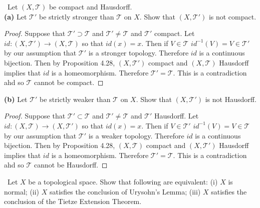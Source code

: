 \documentclass[11pt]{amsart}
\theoremstyle{definition}
\numberwithin{theorem}{section}
\numberwithin{definition}{section}
\numberwithin{equation}{section}
\def\scriptt{{\mathcal T}}
\begin{document}
\medskip {}\ Let $(X, \scriptt)$ be compact and Hausdorff. \\ 
\noindent \textbf{(a)} Let $\scriptt'$ be strictly stronger than $\scriptt$ on $X$. Show that $(X, \scriptt')$ is not compact.
\begin{proof}
	Suppose that $\scriptt' \supset \scriptt$ and $\scriptt' \neq \scriptt$ and $\scriptt'$ compact. Let $
	id: (X, \scriptt') \to (X, \scriptt)$ so that $id(x) = x$. Then if $V \in \scriptt$ $id^{-1}(V) = V \in \scriptt'$
	by our assumption that $\scriptt'$ is a stronger topology. Therefore $id$ is a continuous bijection. Then by Proposition
	4.28, $(X, \scriptt')$ compact and $(X, \scriptt)$ Hausdorff implies that $id$ is a homeomorphism. Therefore $\scriptt' = \scriptt.$ This is a contradiction ahd so $\scriptt$ cannot be compact.
\end{proof}
\noindent \textbf{(b)} Let $\scriptt'$ be strictly weaker than $\scriptt$ on $X$. Show that $(X, \scriptt')$ is not Hausdorff.
\begin{proof}
	Suppose that $\scriptt' \subset \scriptt$ and $\scriptt' \neq \scriptt$ and $\scriptt'$ Hausdorff.  Let $
	id: (X, \scriptt) \to (X, \scriptt')$ so that $id(x) = x$. Then if $V \in \scriptt'$ $id^{-1}(V) = V \in \scriptt$
	by our assumption that $\scriptt'$ is a weaker topology. Therefore $id$ is a continuous bijection. Then by Proposition
	4.28, $(X, \scriptt)$ compact and $(X, \scriptt')$ Hausdorff implies that $id$ is a homeomorphism. Therefore $\scriptt' = \scriptt.$ This is a contradiction ahd so $\scriptt$ cannot be Hausdorff.
\end{proof}
\medskip {}\ Let $X$ be a topological space. Show that following are equivalent: (i) $X$ is normal; (ii) $X$ satisfies the conclusion of Urysohn's Lemma; (iii) $X$ satisfies the conclusion of the Tietze Extension Theorem.
\end{document}
